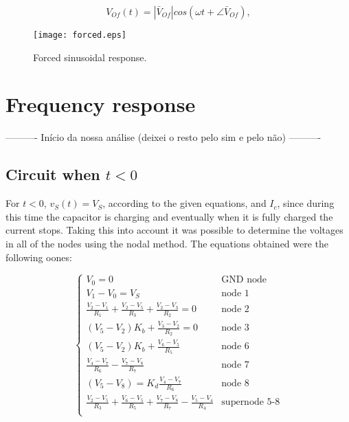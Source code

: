 \begin{equation}
  V_{Of}(t) = |\bar{V}_{Of}| cos(\omega t + \angle \bar{V}_{Of}),
  \label{eq:vo_for}
\end{equation}

\lipsum[1-1]


\begin{figure}[h] \centering
\texttt{[image: forced.eps]}
\caption{Forced sinusoidal response.}
\label{fig:forced}
\end{figure}


\section{Frequency response}








---------- Início da nossa análise (deixei o resto pelo sim e pelo não) ----------




\subsection{Circuit when $t<0$} %
For $t<0$, $v_S(t) = V_S$, according to the given equations, and $I_c$, since during this time the capacitor is charging and eventually when it is fully charged the current stops. Taking this into account it was possible to determine the voltages in all of the nodes using the nodal method. The equations obtained were the following oones:






\begin{equation}
  \begin{cases}
  V_0 = 0 & \mbox{GND node} \\
  V_1-V_0 = V_S & \mbox{node 1} \\
  \frac{V_2-V_1}{R_1}+\frac{V_2-V_5}{R_3}+\frac{V_2-V_3}{R_2} = 0 & \mbox{node 2} \\
  (V_5-V_2)K_b + \frac{V_3-V_2}{R_2} = 0 & \mbox{node 3} \\
  (V_5-V_2)K_b + \frac{V_6-V_5}{R_5} & \mbox{node 6} \\
  \frac{V_4-V_7}{R_6} - \frac{V_7-V_8}{R_7} & \mbox{node 7} \\
  (V_5-V_8) = K_d \frac{V_4-V_7}{R_6} & \mbox{node 8} \\
  \frac{V_2-V_5}{R_3} + \frac{V_6-V_5}{R_5} + \frac{V_7-V_8}{R_7} - \frac{V_5-V_4}{R_4} & \mbox{supernode 5-8} \\ 
  \end{cases}
\end{equation}

